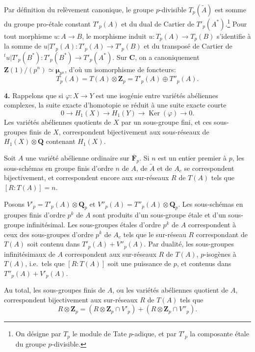 \documentclass[10pt]{amsart}
\theoremstyle{plain}
\theoremstyle{remark}
\DeclareMathOperator{\Ker}{Ker}
\begin{document}
Par d\'efinition du rel\`evement canonique, le groupe $p$-divisible
$T_p(\tilde{A})$ est somme du groupe pro-\'etale constant $T'_p(A)$ et
du dual de Cartier de $T'_p(A^*)$.\footnote{On d\'esigne par $T_p$
le module de Tate $p$-adique, et par $T'_p$ la composante \'etale du
groupe $p$-divisible.} Pour tout morphisme $u\colon A \to B$, le
morphisme induit $u\colon T_p(A) \to T_p(B)$ s'identifie \`a la somme
de $u|T'_p(A)\colon T'_p(A) \to T'_p(B)$ et du transpos\'e de Cartier
de ${}^t u|T'_p(B^*)\colon T'_p(B^*) \to T'_p(A^*)$. Sur $\mathbf{C}$,
on a canoniquement $\mathbf{Z}(1)/(p^n) \simeq \boldsymbol{\mu}_{p^n}$,
d'o\`u un isomorphisme de foncteurs:
\begin{equation}
T_p(A) = T(A) \otimes \mathbf{Z}_p = T'_p(A) \oplus T''_p(A). \tag{3.3}
\end{equation}

\smallskip
\textbf{4.} Rappelons que si $\varphi\colon X \to Y$ est une isog\'enie
entre vari\'et\'es ab\'eliennes complexes, la suite exacte d'homotopie
se r\'eduit \`a une suite exacte courte
\[
0 \longrightarrow H_1(X) \longrightarrow H_1(Y) \longrightarrow
\Ker(\varphi) \longrightarrow 0.
\]
Les vari\'et\'es ab\'eliennes quotients de $X$ par un sous-groupe fini,
et ces sous-groupes finis de $X$, correspondent bijectivement aux
sous-r\'eseaux de $H_1(X) \otimes \mathbf{Q}$ contenant $H_1(X)$.

Soit $A$ une vari\'et\'e ab\'elienne ordinaire sur
$\overline{\mathbf{F}}_p$. Si $n$ est un entier premier \`a $p$, les
sous-sch\'emas en groupe finis d'ordre $n$ de $A$, de $\tilde{A}$ et de
$A_c$ se correspondent bijectivement, et correspondent encore aux
sur-r\'eseaux $R$ de $T(A)$ tels que $[R:T(A)] = n$.

Posons $V'_p = T'_p(A) \otimes \mathbf{Q}_p$ et
$V''_p(A) = T''_p(A) \otimes \mathbf{Q}_p$. Les sous-sch\'emas en groupes
finis d'ordre $p^k$ de $A$ sont produits d'un sous-groupe \'etale et
d'un sous-groupe infinit\'esimal. Les sous-groupes \'etales d'ordre
$p^k$ de $A$ correspondent \`a ceux des sous-groupes d'ordre $p^k$ de
$A_c$ tels que le sur-r\'eseau $R$ correspondant de $T(A)$ soit
contenu dans $T'_p(A) + V''_p(A)$. Par dualit\'e, les sous-groupes
infinit\'esimaux de $A$ correspondent aux sur-r\'eseaux $R$ de $T(A)$,
$p$-isog\`enes \`a $T(A)$, i.e.\ tels que $[R:T(A)]$ soit une puissance
de $p$, et contenus dans $T''_p(A) + V'_p(A)$.

Au total, les sous-groupes finis de $A$, ou les vari\'et\'es ab\'eliennes
quotient de $A$, correspondent bijectivement aux sur-r\'eseaux $R$ de
$T(A)$ tels que
\begin{equation}
R \otimes \mathbf{Z}_p = (R \otimes \mathbf{Z}_p \cap V'_p) +
(R \otimes \mathbf{Z}_p \cap V''_p). \tag{4.1}
\end{equation}
\end{document}
